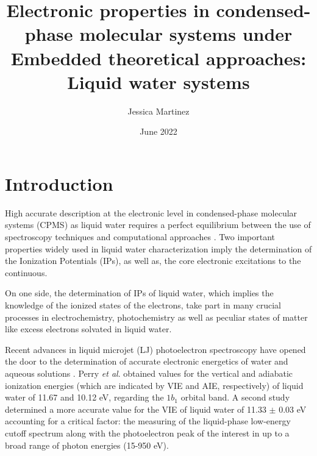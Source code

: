 \documentclass[notitlepage,12pt]{report}
\begin{document}
	\title{Electronic properties in condensed-phase molecular systems under Embedded theoretical approaches: Liquid water systems}
	\author[1]{Jessica Martinez}
	\date{June 2022}
	\renewcommand\Affilfont{\itshape\small}
	\thispagestyle{empty}
\maketitle
\section{Introduction}

	High accurate description at the electronic level in condensed-phase molecular systems (CPMS) as liquid water requires a perfect equilibrium between the use of spectroscopy techniques\supercite{reimann2021two,malerz2021low,bolognesi2021combined} and computational approaches \supercite{couto2007understanding,ambrosio2016structural,ozaki2021advances}. Two important properties widely used in liquid water characterization imply the determination of the Ionization Potentials (IPs)\supercite{thurmer2021accurate,perry2020ionization,credidio2021quantitative,thurmer2021valence,tolle2019charged,gaiduk2018electron,gaiduk2016photoelectron,seidel2016valence}, as well as, the core electronic excitations to the continuous\supercite{zhovtobriukh2019liquid,zhang2020isotope,smith2020femtosecond}.
	
	On one side, the determination of IPs of liquid water, which implies the knowledge of the ionized states of the electrons, take part in many crucial processes in electrochemistry\supercite{marenich2014computational}, photochemistry\supercite{reuther1996primary,hu2021photochemical} as well as peculiar states of matter like excess electrons solvated in liquid water\supercite{ambrosio2017electronic}. 
	
	Recent advances in liquid microjet (LJ) photoelectron spectroscopy have opened the door to the determination of accurate electronic energetics of water and aqueous solutions \supercite{thurmer2021accurate,perry2020ionization,credidio2021quantitative,thurmer2021valence}. Perry \textit{et al}. \supercite{perry2020ionization} obtained values for the vertical and adiabatic ionization energies (which are indicated by VIE and AIE, respectively) of liquid water of 11.67 and 10.12 eV, regarding the $1b_1$ orbital band.   A second study determined a more accurate value for the VIE of liquid water of 11.33 $\pm$ 0.03 eV accounting for a critical factor: the measuring of the liquid-phase low-energy cutoff spectrum along with the photoelectron peak of the interest in up to a broad range of photon energies (15-950 eV)\supercite{thurmer2021accurate}.
	
\end{document}
